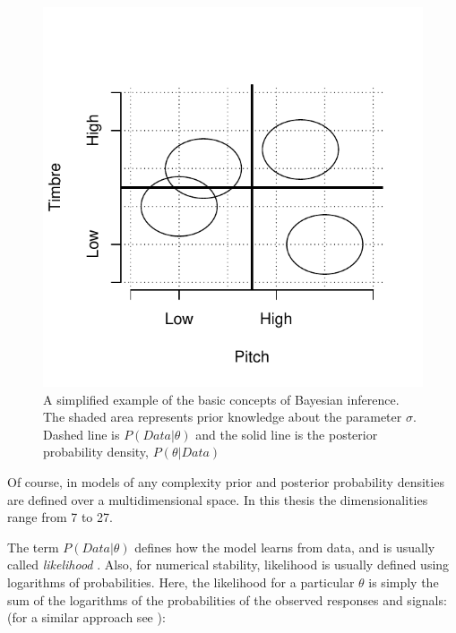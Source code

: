 \documentclass{article}\usepackage{knitr}
\begin{document}
\begin{figure}
\centering
\begin{knitrout}
\color{fgcolor}
\includegraphics[width=\maxwidth]{figure/unnamed-chunk-12-1} 

\end{knitrout}
\caption{A simplified example of the basic concepts of Bayesian inference. The shaded area represents prior knowledge about the parameter $\sigma$. Dashed line is $P(Data | \theta)$ and the solid line is the posterior probability density, $P(\theta | Data)$}
\label{fig:priorpost}
\end{figure}

Of course, in models of any complexity prior and posterior probability densities are defined over a multidimensional space. In this thesis the dimensionalities range from 7 to 27. 

The term $P(Data | \theta)$ defines how the model learns from data, and is usually called \textit{likelihood} \citep{kruschke2015}. Also, for numerical stability, likelihood is usually defined using logarithms of probabilities. Here, the likelihood for a particular $\theta$ is simply the sum of the logarithms of the probabilities of the observed  responses and signals: (for a similar approach see \citet[p. 218]{wickens1992}):
\end{document}
